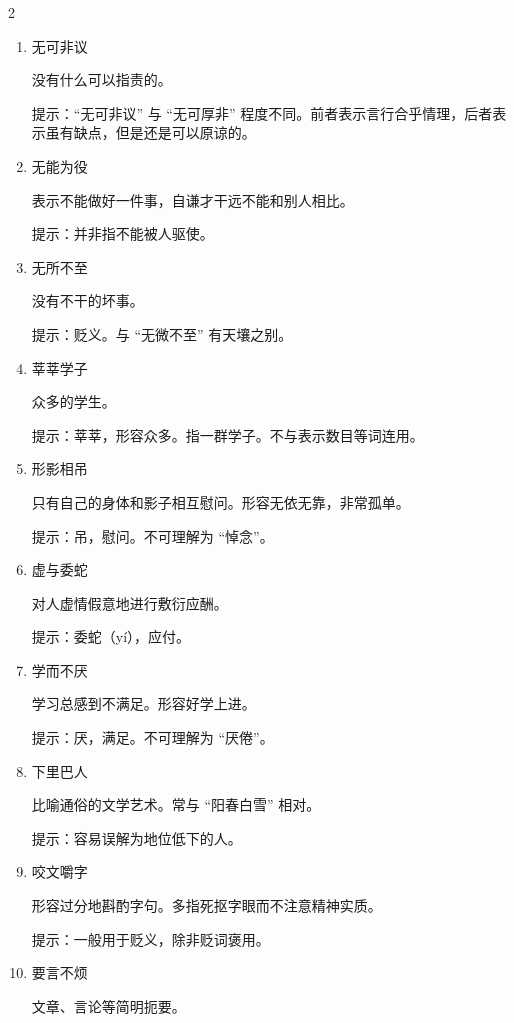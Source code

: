 \documentclass[final,oneside]{ctexbook}
\begin{document}
\begin{multicols}{2}
\begin{enumerate}
    \item 无可非议

      没有什么可以指责的。

      提示：“无可非议” 与 “无可厚非” 程度不同。前者表示言行合乎情理，后者表示虽有缺点，但是还是可以原谅的。

    \item 无能为役

      表示不能做好一件事，自谦才干远不能和别人相比。

      提示：并非指不能被人驱使。

    \item 无所不至

      没有不干的坏事。

      提示：贬义。与 “无微不至” 有天壤之别。

    \item 莘莘学子

      众多的学生。

      提示：莘莘，形容众多。指一群学子。不与表示数目等词连用。

    \item 形影相吊

      只有自己的身体和影子相互慰问。形容无依无靠，非常孤单。

      提示：吊，慰问。不可理解为 “悼念”。

    \item 虚与委蛇

      对人虚情假意地进行敷衍应酬。

      提示：委蛇（yí），应付。

    \item 学而不厌

      学习总感到不满足。形容好学上进。

      提示：厌，满足。不可理解为 “厌倦”。

    \item 下里巴人

      比喻通俗的文学艺术。常与 “阳春白雪” 相对。

      提示：容易误解为地位低下的人。

    \item 咬文嚼字

      形容过分地斟酌字句。多指死抠字眼而不注意精神实质。

      提示：一般用于贬义，除非贬词褒用。

    \item 要言不烦

      文章、言论等简明扼要。


\end{enumerate}
\end{multicols}
\end{document}
